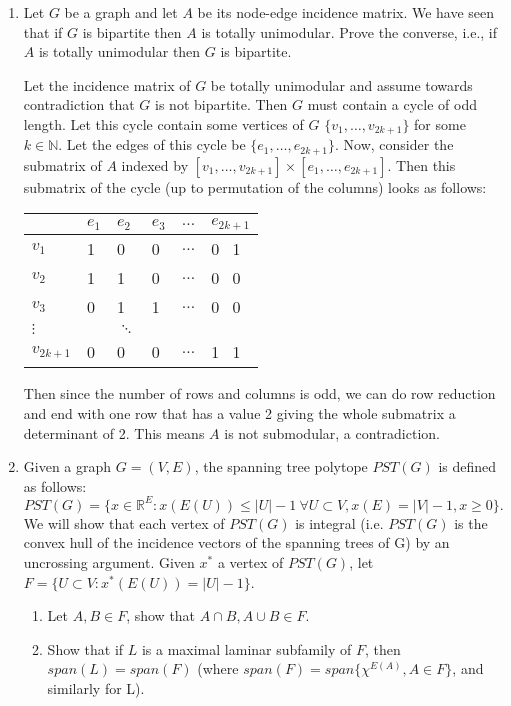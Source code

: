 \documentclass[11pt]{article}
\newcommand{\setR}{\mathbb{R}}
\begin{document}
\begin{enumerate}[1)]
\item Let $G$ be a graph and let $A$ be its node-edge incidence matrix. We have seen that if $G$ is
bipartite then $A$ is totally unimodular. Prove the converse, i.e., if $A$ is totally unimodular then $G$
is bipartite.

\begin{solution}
Let the incidence matrix of $G$ be totally unimodular and assume towards contradiction that $G$ is not bipartite. Then $G$ must contain a cycle of odd length. Let this cycle contain some vertices of $G$ $\{v_1, \hdots, v_{2k+1}\}$ for some $k \in \mathbb{N}$. Let the edges of this cycle be $\{e_1, \hdots, e_{2k+1}\}$. Now, consider the submatrix of $A$ indexed by $[v_1, \hdots, v_{2k+1}] \times [e_1, \hdots, e_{2k+1}]$.  
Then this submatrix of the cycle (up to permutation of the columns) looks as follows: \\

\begin{tabular}{l | l l l l l }
 & $e_1$ & $e_2$ &$e_3$ & $\hdots$ & $e_{2k+1}$ \\
 \midrule
$v_1$ & 1 & 0 & 0 &  $\hdots$ & 0 \ 1 \\
$v_2$ & 1 & 1 & 0 & $\hdots$ & 0 \ 0 \\
$v_3$ & 0 & 1 & 1 & $\hdots$ &  0 \ 0  \\
$\vdots$ & & $\ddots$ & & &  \\
$v_{2k+1}$ & 0 & 0 & 0 & $\hdots$ & 1 \ 1
\end{tabular}


Then since the number of rows and columns is odd, we can do row reduction and end with one row that has a value 2 giving the whole submatrix a determinant of 2. This means $A$ is not submodular, a contradiction. 
\end{solution}


\item Given a graph $G=(V,E)$, the spanning tree polytope $PST(G)$ is defined as follows:
$$PST (G) = \{x∈\setR^E : x(E(U)) ≤|U|−1 \ ∀U ⊂V, x(E) = |V|−1, x≥0\}.$$
We will show that each vertex of $PST(G)$ is integral (i.e. $PST (G)$ is the convex hull of the incidence
vectors of the spanning trees of G) by an uncrossing argument. 
Given $x^*$ a vertex of $PST (G)$, let $F= \{U ⊂V : x^*(E(U)) = |U|−1\}$.
\begin{enumerate}
\item Let $A,B ∈F$, show that $A∩B,A∪B ∈F$.
\item Show that if $L$ is a maximal laminar subfamily of $F$, then $span(L) = span(F)$ (where
$span(F) = span\{χ^{E(A)},A∈F\}$, and similarly for L).
\end{enumerate}




\end{enumerate}
\end{document}

